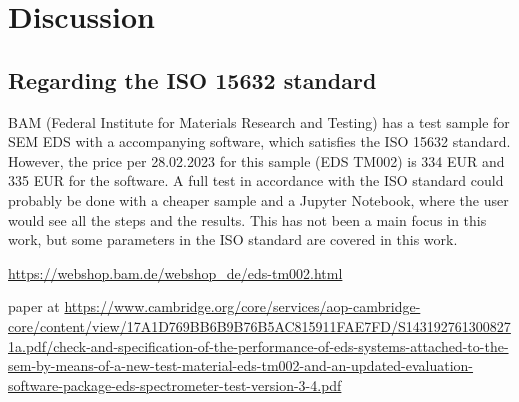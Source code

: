 %
\chapter{Discussion}
\label{ch:discussion}












\section{Regarding the ISO 15632 standard}
\label{theory:eds_performance:iso15632}

BAM (Federal Institute for Materials Research and Testing) has a test sample for SEM EDS with a accompanying software, which satisfies the ISO 15632 standard.
However, the price per 28.02.2023 for this sample (EDS TM002) is 334 EUR and 335 EUR for the software.
A full test in accordance with the ISO standard could probably be done with a cheaper sample and a Jupyter Notebook, where the user would see all the steps and the results.
This has not been a main focus in this work, but some parameters in the ISO standard are covered in this work.

\url{https://webshop.bam.de/webshop_de/eds-tm002.html}

paper at \url{https://www.cambridge.org/core/services/aop-cambridge-core/content/view/17A1D769BB6B9B76B5AC815911FAE7FD/S1431927613008271a.pdf/check-and-specification-of-the-performance-of-eds-systems-attached-to-the-sem-by-means-of-a-new-test-material-eds-tm002-and-an-updated-evaluation-software-package-eds-spectrometer-test-version-3-4.pdf}














